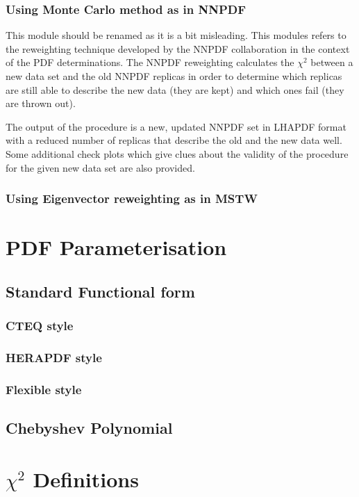 \documentclass[11pt,a4paper]{article}
\begin{document}
\subsubsection{Using Monte Carlo method as in NNPDF}
This module should be renamed as it is a bit misleading.
This modules refers to the reweighting technique developed
by the NNPDF collaboration in the context of the PDF determinations.
The NNPDF reweighting calculates the $\chi^2$ between a new data set and the old NNPDF replicas in order to determine which replicas are still able to describe the new data (they are kept) and which ones fail (they are thrown out).

The output of the procedure is a new, updated NNPDF set in LHAPDF format with a reduced number of replicas that describe the old and the new data well. 
Some additional check plots which give clues about the validity of the procedure for the given new data set are also provided.
\subsubsection{Using Eigenvector reweighting as in MSTW}
 
\section{PDF Parameterisation}
\label{sec:pdfparam}
\subsection{Standard Functional form}
\subsubsection{CTEQ style}
\subsubsection{HERAPDF style}
\subsubsection{Flexible style}
\subsection{Chebyshev Polynomial}

\section{$\chi^2$ Definitions}
\label{sec:chi2}
\end{document}
